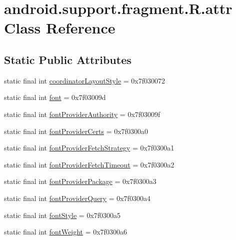 \hypertarget{classandroid_1_1support_1_1fragment_1_1_r_1_1attr}{}\section{android.\+support.\+fragment.\+R.\+attr Class Reference}
\label{classandroid_1_1support_1_1fragment_1_1_r_1_1attr}
\subsection*{Static Public Attributes}
\begin{DoxyCompactItemize}
\item 
static final int \mbox{\hyperlink{classandroid_1_1support_1_1fragment_1_1_r_1_1attr_ade8c781eaef42aae2f1161a4e51536a6}{coordinator\+Layout\+Style}} = 0x7f030072
\item 
static final int \mbox{\hyperlink{classandroid_1_1support_1_1fragment_1_1_r_1_1attr_ade8c890db04a0ca4fdb5dede45184b20}{font}} = 0x7f03009d
\item 
static final int \mbox{\hyperlink{classandroid_1_1support_1_1fragment_1_1_r_1_1attr_a6a21a3f7bd07752d2c3ed2140e90171a}{font\+Provider\+Authority}} = 0x7f03009f
\item 
static final int \mbox{\hyperlink{classandroid_1_1support_1_1fragment_1_1_r_1_1attr_a95ec7b1611790860e7f63a3f482e2da6}{font\+Provider\+Certs}} = 0x7f0300a0
\item 
static final int \mbox{\hyperlink{classandroid_1_1support_1_1fragment_1_1_r_1_1attr_a811d39f2d60dad7005ceaa4a50081857}{font\+Provider\+Fetch\+Strategy}} = 0x7f0300a1
\item 
static final int \mbox{\hyperlink{classandroid_1_1support_1_1fragment_1_1_r_1_1attr_ab22f7ae6227babc9982d5cd8424b4569}{font\+Provider\+Fetch\+Timeout}} = 0x7f0300a2
\item 
static final int \mbox{\hyperlink{classandroid_1_1support_1_1fragment_1_1_r_1_1attr_ab9c71c3f4d3b81bd0242122a5fd9a69d}{font\+Provider\+Package}} = 0x7f0300a3
\item 
static final int \mbox{\hyperlink{classandroid_1_1support_1_1fragment_1_1_r_1_1attr_a26f816c1cff308c8421bd73d47a628d8}{font\+Provider\+Query}} = 0x7f0300a4
\item 
static final int \mbox{\hyperlink{classandroid_1_1support_1_1fragment_1_1_r_1_1attr_af1bea947c37a493d555964ec7da45301}{font\+Style}} = 0x7f0300a5
\item 
static final int \mbox{\hyperlink{classandroid_1_1support_1_1fragment_1_1_r_1_1attr_aa1c78e37abb086b77be7428e9f8a0f3a}{font\+Weight}} = 0x7f0300a6

\end{DoxyCompactItemize}
